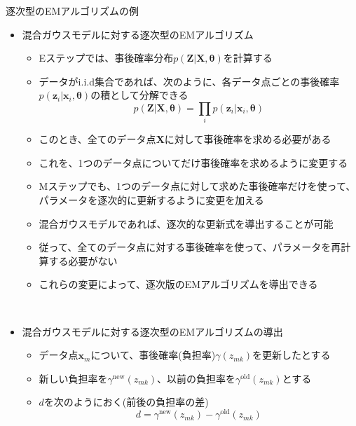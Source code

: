 \documentclass[dvipdfmx,notheorems,t]{beamer}
\begin{document}
\begin{frame}{逐次型のEMアルゴリズムの例}

\begin{itemize}
	\item 混合ガウスモデルに対する逐次型のEMアルゴリズム
	\begin{itemize}
		\item Eステップでは、事後確率分布$p(\bm{Z} | \bm{X}, \bm{\theta})$を計算する
		\item データが\alert{i.i.d集合}であれば、次のように、各データ点ごとの事後確率$p(\bm{z}_i | \bm{x}_i, \bm{\theta})$の積として分解できる
		\begin{equation}
			p(\bm{Z} | \bm{X}, \bm{\theta}) = \prod_i p(\bm{z}_i | \bm{x}_i, \bm{\theta})
		\end{equation}
		
		\item このとき、\alert{全てのデータ点}$\bm{X}$に対して事後確率を求める必要がある
		\item これを、\alert{1つのデータ点}についてだけ事後確率を求めるように変更する
		\newline
		\item Mステップでも、1つのデータ点に対して求めた事後確率だけを使って、パラメータを逐次的に更新するように変更を加える
		\item 混合ガウスモデルであれば、逐次的な更新式を導出することが可能
		\newline
		\item 従って、全てのデータ点に対する事後確率を使って、パラメータを再計算する必要がない
		\newline
		\item これらの変更によって、\alert{逐次版のEMアルゴリズム}を導出できる
	\end{itemize} \
	
	\item 混合ガウスモデルに対する逐次型のEMアルゴリズムの導出
	\begin{itemize}
		\item データ点$\bm{x}_m$について、事後確率(負担率)$\gamma(z_{mk})$を更新したとする
		\newline
		\item 新しい負担率を$\gamma^\mathrm{new}(z_{mk})$、以前の負担率を$\gamma^\mathrm{old}(z_{mk})$とする
		\newline
		\item $d$を次のようにおく(前後の負担率の差)
		\begin{equation}
			d = \gamma^\mathrm{new}(z_{mk}) - \gamma^\mathrm{old}(z_{mk})
		\end{equation}
		

\end{itemize}
\end{itemize}
\end{frame}
\end{document}
